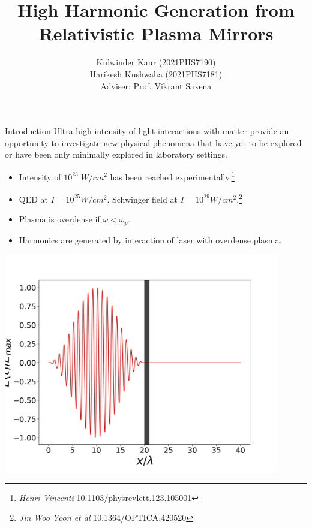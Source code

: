 \documentclass{beamer}
\title[High Harmonic Generation]{High Harmonic Generation from Relativistic Plasma Mirrors}
\date{}
\institute[IITD]{\large Indian Institute of Technology, Delhi}
\author[]{Kulwinder Kaur (2021PHS7190)\\ Harikesh Kushwaha (2021PHS7181)\\[3mm]Adviser: Prof. Vikrant Saxena}
\begin{document}
\maketitle

\begin{frame}{Introduction}
    \small
    Ultra high intensity of light interactions with matter provide an opportunity to investigate new physical phenomena that have yet to be explored or have been only minimally explored in laboratory settings.
    \begin{itemize}
        \item Intensity of $10^{23} \; W/cm^{2}$ has been reached experimentally.\footnote{\textit{Henri Vincenti} 10.1103/physrevlett.123.105001}
        \item QED at $I = 10^{25}W/cm^{2}$. Schwinger field at $I = 10^{29}W/cm^{2}$.\footnote{\textit{Jin Woo Yoon et al} 10.1364/OPTICA.420520}
        \item Plasma is overdense if $\omega<\omega_p$.
        \item Harmonics are generated by interaction of laser with overdense plasma.
    \end{itemize}
    \begin{minipage}[h]{0.48\linewidth}
        \centering
        \includegraphics[width=0.9\textwidth, height=0.42\textheight]{images/field.jpg}
        \label{fig:field}
    \end{minipage}
    \begin{minipage}[h]{0.48\linewidth}
        \begin{figure}
            \centering

\end{figure}
\end{minipage}
\end{frame}
\end{document}
